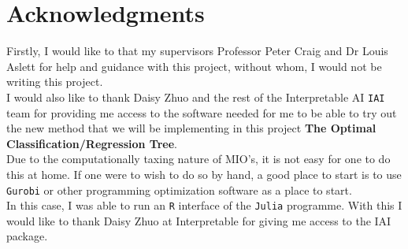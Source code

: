 \documentclass[11pt,a4paper]{report}
\begin{document}
\chapter*{Acknowledgments}
Firstly, I would like to that my supervisors Professor Peter Craig and Dr Louis Aslett for help and guidance with this project, without whom, I would not be writing this project.
\bigskip\\
I would also like to thank Daisy Zhuo and the rest of the Interpretable AI \texttt{IAI} team for providing me access to the software needed for me to be able to try out the new method that we will be implementing in this project \textbf{The Optimal Classification/Regression Tree}.\\
{\color{violet}Due to the computationally taxing nature of MIO's, it is not easy for one to do this at home.
If one were to wish to do so by hand, a good place to start is to use {\color{blue} \texttt{Gurobi}} or other programming optimization software as a place to start.
\medskip\\
In this case, I was able to run an {\color{blue} \texttt{R}} interface of the {\color{blue} \texttt{Julia}} programme.
With this I would like to thank Daisy Zhuo at Interpretable for giving me access to the IAI package.}




\end{document}
